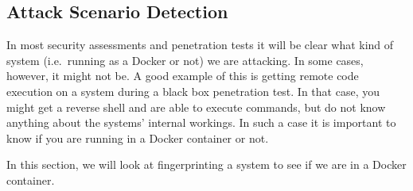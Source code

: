 \subsection{Attack Scenario Detection}
In most security assessments and penetration tests it will be clear what kind of system (i.e.\ running as a Docker or not) we are attacking. In some cases, however, it might not be. A good example of this is getting remote code execution on a system during a black box penetration test. In that case, you might get a reverse shell and are able to execute commands, but do not know anything about the systems' internal workings. In such a case it is important to know if you are running in a Docker container or not.

In this section, we will look at fingerprinting a system to see if we are in a Docker container.





